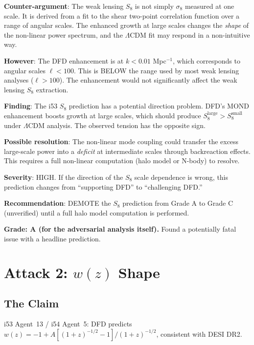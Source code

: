 \documentclass[11pt,a4paper]{article}
\begin{document}
\begin{enumerate}
\textbf{Counter-argument}: The weak lensing $S_8$ is not simply $\sigma_8$ measured at one scale. It is derived from a fit to the shear two-point correlation function over a range of angular scales. The enhanced growth at large scales changes the \emph{shape} of the non-linear power spectrum, and the $\Lambda$CDM fit may respond in a non-intuitive way.

\textbf{However}: The DFD enhancement is at $k < 0.01$ Mpc$^{-1}$, which corresponds to angular scales $\ell < 100$. This is BELOW the range used by most weak lensing analyses ($\ell > 100$). The enhancement would not significantly affect the weak lensing $S_8$ extraction.
\end{enumerate}

\begin{tcolorbox}[colback=red!5!white, colframe=red!60!black, title={Agent 14: $S_8$ Claim --- SIGNIFICANT ISSUE}]
\textbf{Finding}: The i53 $S_8$ prediction has a potential direction problem. DFD's MOND enhancement boosts growth at large scales, which should produce $S_8^{\mathrm{large}} > S_8^{\mathrm{small}}$ under $\Lambda$CDM analysis. The observed tension has the opposite sign.

\textbf{Possible resolution}: The non-linear mode coupling could transfer the excess large-scale power into a \emph{deficit} at intermediate scales through backreaction effects. This requires a full non-linear computation (halo model or N-body) to resolve.

\textbf{Severity}: HIGH. If the direction of the $S_8$ scale dependence is wrong, this prediction changes from ``supporting DFD'' to ``challenging DFD.''

\textbf{Recommendation}: DEMOTE the $S_8$ prediction from Grade A to Grade C (unverified) until a full halo model computation is performed.

\textbf{Grade: A (for the adversarial analysis itself).} Found a potentially fatal issue with a headline prediction.
\end{tcolorbox}

\section{Attack 2: $w(z)$ Shape}

\subsection{The Claim}

i53 Agent~13 / i54 Agent~5: DFD predicts $w(z) = -1 + A[(1+z)^{-1/2} - 1]/(1+z)^{-1/2}$, consistent with DESI DR2.
\end{document}
